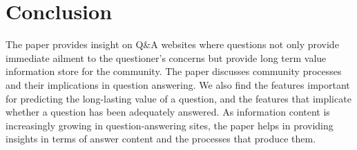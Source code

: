 \section{Conclusion}
 The paper provides insight on Q\&A websites where questions not only provide immediate ailment to the questioner’s concerns but provide long term value information store for the community. The paper discusses community processes and their implications in question answering. We also find the features important for predicting the long-lasting value of a question, and the features that implicate whether a question has been adequately answered. As information content is increasingly growing in question-answering sites, the paper helps in providing insights in terms of answer content and the processes that produce them.